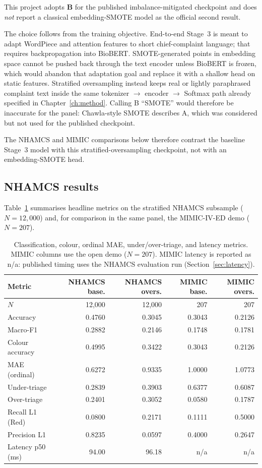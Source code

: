 This project adopts \textbf{B} for the published imbalance-mitigated checkpoint and does \emph{not} report a classical embedding-SMOTE model as the official second result.

The choice follows from the training objective. End-to-end Stage~3 is meant to adapt WordPiece and attention features to short chief-complaint language; that requires backpropagation into BioBERT. SMOTE-generated points in embedding space cannot be pushed back through the text encoder unless BioBERT is frozen, which would abandon that adaptation goal and replace it with a shallow head on static features. Stratified oversampling instead keeps real or lightly paraphrased complaint text inside the same tokenizer \(\rightarrow\) encoder \(\rightarrow\) Softmax path already specified in Chapter~\ref{ch:method}. Calling B ``SMOTE'' would therefore be inaccurate for the panel: Chawla-style SMOTE \citep{chawla2002smote} describes A, which was considered but not used for the published checkpoint.

The NHAMCS and MIMIC comparisons below therefore contrast the baseline Stage~3 model with this stratified-oversampling checkpoint, not with an embedding-SMOTE head.

\subsection{NHAMCS results}

Table~\ref{tab:external-metrics} summarises headline metrics on the stratified NHAMCS subsample (\(N=12{,}000\)) and, for comparison in the same panel, the MIMIC-IV-ED demo (\(N=207\)).

\begin{table}[H]
\centering
\small
\begin{tabular}{|l|r|r|r|r|}
\hline
\textbf{Metric} & \textbf{NHAMCS base.} & \textbf{NHAMCS overs.} & \textbf{MIMIC base.} & \textbf{MIMIC overs.} \\
\hline
\(N\) & 12{,}000 & 12{,}000 & 207 & 207 \\
Accuracy & 0.4760 & 0.3045 & 0.3043 & 0.2126 \\
Macro-F1 & 0.2882 & 0.2146 & 0.1748 & 0.1781 \\
Colour accuracy & 0.4995 & 0.3422 & 0.3043 & 0.2126 \\
MAE (ordinal) & 0.6272 & 0.9335 & 1.0000 & 1.0773 \\
Under-triage & 0.2839 & 0.3903 & 0.6377 & 0.6087 \\
Over-triage & 0.2401 & 0.3052 & 0.0580 & 0.1787 \\
Recall L1 (Red) & 0.0800 & 0.2171 & 0.1111 & 0.5000 \\
Precision L1 & 0.8235 & 0.0597 & 0.4000 & 0.2647 \\
Latency p50 (ms) & 94.00 & 96.18 & n/a & n/a \\
\hline
\end{tabular}
\caption{Classification, colour, ordinal MAE, under/over-triage, and latency metrics. MIMIC columns use the open demo (\(N=207\)). MIMIC latency is reported as n/a: published timing uses the NHAMCS evaluation run (Section~\ref{sec:latency}).}
\label{tab:external-metrics}
\end{table}

